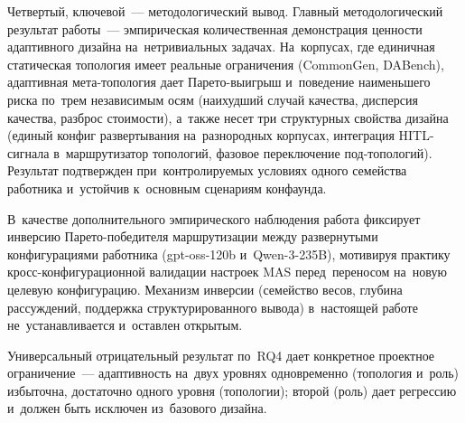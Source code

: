 Четвертый, ключевой~--- методологический вывод. Главный
методологический результат работы~--- эмпирическая количественная
демонстрация ценности адаптивного дизайна на~нетривиальных
задачах. На~корпусах, где единичная статическая топология имеет
реальные ограничения (CommonGen, DABench), адаптивная мета-топология
дает Парето-выигрыш и~поведение наименьшего риска по~трем
независимым осям (наихудший случай качества, дисперсия качества,
разброс стоимости), а~также несет три структурных свойства дизайна
(единый конфиг развертывания на~разнородных корпусах, интеграция
HITL-сигнала в~маршрутизатор топологий, фазовое переключение
под-топологий). Результат подтвержден при~контролируемых условиях
одного семейства работника и~устойчив к~основным сценариям
конфаунда.

В~качестве дополнительного эмпирического наблюдения работа
фиксирует инверсию Парето-победителя маршрутизации между
развернутыми конфигурациями работника (gpt-oss-120b и~Qwen-3-235B),
мотивируя практику кросс-конфигурационной валидации настроек MAS
перед~переносом на~новую целевую конфигурацию. Механизм инверсии
(семейство весов, глубина рассуждений, поддержка структурированного
вывода) в~настоящей работе не~устанавливается и~оставлен открытым.

Универсальный отрицательный результат по~RQ4 дает конкретное
проектное ограничение~--- адаптивность на~двух уровнях
одновременно (топология и~роль) избыточна, достаточно одного
уровня (топологии); второй (роль) дает регрессию и~должен быть
исключен из~базового дизайна.
